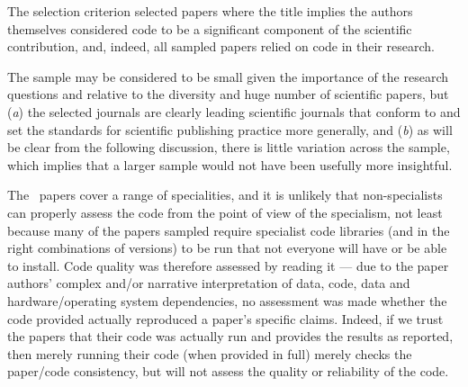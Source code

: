 The selection criterion selected papers where the title implies the authors themselves considered code to be a significant component of the scientific contribution, and, indeed, all sampled papers relied on code in their research. 

The sample may be considered to be small given the importance of the research questions and relative to the diversity and huge number of scientific papers, but (\emph{a\/}) the selected journals are clearly leading scientific journals that conform to and set the standards for scientific publishing practice more generally, and (\emph{b\/}) as will be clear from the following discussion, there is little variation across the sample, which implies that a larger sample would not have been usefully more insightful.


The \the\dataN\ papers cover a range of specialities, and it is unlikely that non-specialists can properly assess the code from the point of view of the specialism, not least because many of the papers sampled require specialist code libraries (and in the right combinations of versions) to be run that not everyone will have or be able to install. Code quality was therefore assessed by reading it --- due to the paper authors' complex and/or narrative interpretation of data, code, data and hardware/operating system dependencies, no assessment was made whether the code provided actually reproduced a paper's specific claims. Indeed, if we trust the papers that their code was actually run and provides the results as reported, then merely running their code (when provided in full) merely checks the paper/code consistency, but will not assess the quality or reliability of the code.


